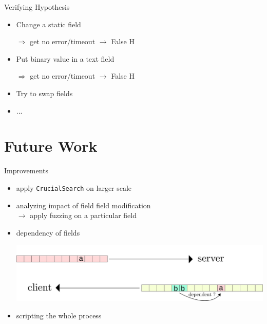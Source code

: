 \documentclass{beamer}
\newcounter{m} %
\newcounter{c} %
\begin{document}
  \begin{frame}{Verifying Hypothesis}
  \begin{itemize}
  \item Change a static field

  $\Rightarrow$ get no error/timeout $\rightarrow$ False H
  
  \bigskip

  \item Put binary value in a text field
  
  $\Rightarrow$ get no error/timeout $\rightarrow$ False H
  
  
\bigskip

  \item Try to swap fields
  
\bigskip

	\item ...  
  \end{itemize}
  \end{frame}


\section{Future Work}
\begin{frame}

	\tableofcontents[currentsection]
\end{frame}

\begin{frame}{Improvements}

\begin{itemize}
    \item apply \texttt{CrucialSearch} on larger scale
    \item analyzing impact of field field modification\\
    \quad\quad $\rightarrow$ apply fuzzing on a particular field
    \item dependency of fields\\
    \begin{center}\includegraphics[scale=0.5]{relations.png}\end{center}
    \item scripting the whole process
\end{itemize}
\end{frame}
\end{document}

